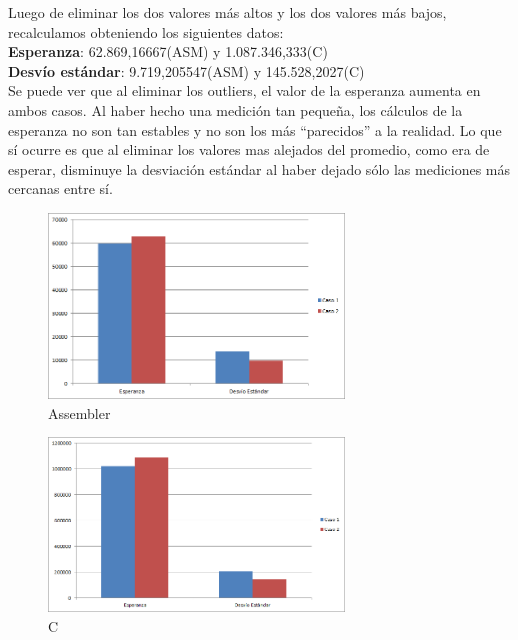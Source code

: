 \begin{enumerate}
	Luego de eliminar los dos valores m\'as altos y los dos valores m\'as bajos, recalculamos obteniendo los siguientes datos: \\
	\textbf{Esperanza}: 62.869,16667(ASM) y 1.087.346,333(C)\\
	\textbf{Desvío est\'andar}:	9.719,205547(ASM) y 145.528,2027(C)\\

	Se puede ver que al eliminar los outliers, el valor de la esperanza aumenta en ambos casos. Al haber hecho una medici\'on tan peque\~na, los c\'alculos de la esperanza no son tan estables y no son los m\'as ``parecidos'' a la realidad. Lo que s\'i ocurre es que al eliminar los valores mas alejados del promedio, como era de esperar, disminuye la desviaci\'on est\'andar al haber dejado s\'olo las mediciones m\'as cercanas entre s\'i.\\

\begin{figure}[h!]
  \begin{center}
	\includegraphics[width=0.7\textwidth]{imagenes/asm1}
	\caption{Assembler}
      \end{center}
\end{figure}

\newpage 
\begin{figure}[h!]
  \begin{center}
	\includegraphics[width=0.7\textwidth]{imagenes/C1}
	\caption{C}
  \end{center}
\end{figure}



\end{enumerate}
